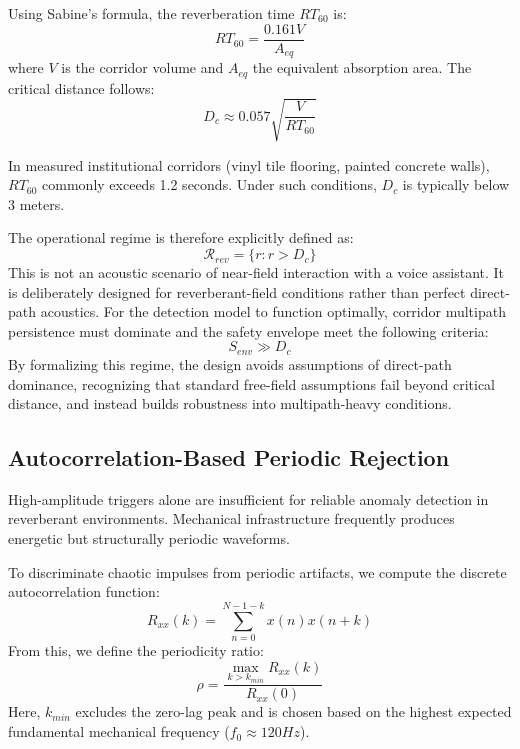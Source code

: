 \documentclass[conference]{IEEEtran}
\begin{document}
Using Sabine’s formula, the reverberation time $RT_{60}$ is:
\begin{equation}
RT_{60} = \frac{0.161 V}{A_{eq}}
\end{equation}
where $V$ is the corridor volume and $A_{eq}$ the equivalent absorption area. The critical distance follows:
\begin{equation}
D_c \approx 0.057 \sqrt{\frac{V}{RT_{60}}}
\end{equation}

In measured institutional corridors (vinyl tile flooring, painted concrete walls), $RT_{60}$ commonly exceeds 1.2 seconds. Under such conditions, $D_c$ is typically below 3 meters.

The operational regime is therefore explicitly defined as:
\begin{equation}
\mathcal{R}_{rev} = \{ r : r > D_c \}
\end{equation}
This is not an acoustic scenario of near-field interaction with a voice assistant. It is deliberately designed for reverberant-field conditions rather than perfect direct-path acoustics. For the detection model to function optimally, corridor multipath persistence must dominate and the safety envelope meet the following criteria:
\begin{equation}
S_{env} \gg D_c
\end{equation}
By formalizing this regime, the design avoids assumptions of direct-path dominance, recognizing that standard free-field assumptions fail beyond critical distance, and instead builds robustness into multipath-heavy conditions.

\subsection{Autocorrelation-Based Periodic Rejection}
High-amplitude triggers alone are insufficient for reliable anomaly detection in reverberant environments. Mechanical infrastructure frequently produces energetic but structurally periodic waveforms.

To discriminate chaotic impulses from periodic artifacts, we compute the discrete autocorrelation function:
\begin{equation}
R_{xx}(k) = \sum_{n=0}^{N-1-k} x(n)x(n+k)
\end{equation}
From this, we define the periodicity ratio:
\begin{equation}
\rho = \frac{\max_{k > k_{min}} R_{xx}(k)}{R_{xx}(0)}
\end{equation}
Here, $k_{min}$ excludes the zero-lag peak and is chosen based on the highest expected fundamental mechanical frequency ($f_0 \approx 120Hz$).
\end{document}
